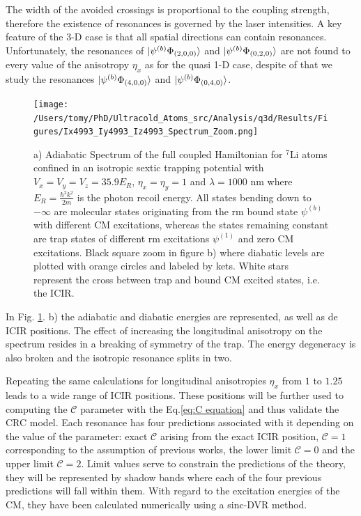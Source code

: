 \documentclass[aps,pre,twocolumn,superscriptaddress,showpacs]{revtex4-1}
\begin{document}
The width of the avoided crossings is proportional to the coupling strength, therefore the existence of resonances is governed by the laser intensities. A key feature of the 3-D case is that all spatial directions can contain resonances. Unfortunately, the resonances of $\ket{ \psi^{(b)} \Phi_{(2,0,0)}} $ and $\ket{ \psi^{(b)} \Phi_{(0,2,0)}}$ are not found to every value of the anisotropy $\eta_x$ as for the quasi 1-D case, despite of that we study the resonances  $\ket{ \psi^{(b)} \Phi_{(4,0,0)}} $ and $\ket{ \psi^{(b)} \Phi_{(0,4,0)}}$.
\begin{figure}[htbp!]
\centering
\texttt{[image: /Users/tomy/PhD/Ultracold\_Atoms\_src/Analysis/q3d/Results/Figures/Ix4993\_Iy4993\_Iz4993\_Spectrum\_Zoom.png]}
\caption{a) Adiabatic Spectrum of the full coupled Hamiltonian for $^7$Li atoms confined in an isotropic sextic trapping potential with $V_x = V_y = V_z = 35.9E_R$, $\eta_x = \eta_y = 1$ and 
$\lambda=1000$ nm where $E_R = \frac{\hbar^2k^2}{2m}$ is the photon recoil energy. All states bending down to $-\infty$ are molecular states originating from the rm bound state $\psi^{(b)}$ 
with different CM excitations, whereas the states remaining constant are trap states of different rm excitations $\psi^{(1)}$ and zero CM excitations. Black square zoom in figure b) where diabatic 
levels are plotted with orange circles and labeled by kets. White stars represent the cross between trap and bound CM excited states, i.e. the ICIR.}
\label{fig:3D spectrum}
\end{figure}

In Fig. \ref{fig:3D spectrum}. b) the adiabatic and diabatic energies are represented, as well as de ICIR positions. The effect of increasing the longitudinal anisotropy on the spectrum resides in a breaking of symmetry of the trap. The energy degeneracy is also broken and the isotropic resonance splits in two.

Repeating the same calculations for longitudinal anisotropies $\eta_x$ from $1$ to $1.25$  leads to a wide range of ICIR positions.  These positions will be further used to computing the $\mathcal{C}$ parameter with the Eq.\eqref{eq:C equation} and thus validate the CRC model. Each resonance has four predictions associated with it depending on the value of the parameter: exact $\mathcal{C}$ arising from the exact ICIR position, $\mathcal{C} = 1$ corresponding to the assumption of previous works, the lower limit $\mathcal{C} = 0$ and the upper limit $\mathcal{C}=2$. Limit values serve to constrain the predictions of the theory, they will be represented by shadow bands where each of the four previous predictions will fall within them. With regard to the excitation energies of the CM, they have been calculated numerically using a sinc-DVR method.
\end{document}

